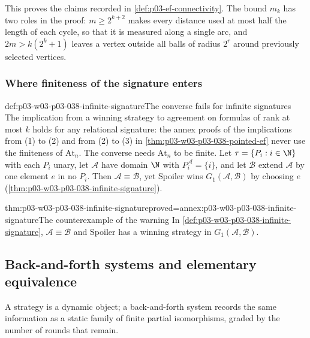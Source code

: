 This proves the claims recorded in \cref{def:p03-ef-connectivity}. The bound
\(m_k\) has two roles in the proof: \(m\ge2^{k+2}\) makes every distance
used at most half the length of each cycle, so that it is measured along a
single arc, and \(2m>k(2^k+1)\) leaves a vertex outside all balls of radius
\(2^r\) around previously selected vertices.

\subsubsection{Where finiteness of the signature enters}

\begin{hbwarning}{def:p03-w03-p03-038-infinite-signature}{The converse fails for infinite signatures}
The implication from a winning strategy to agreement on formulas of rank at
most \(k\) holds for any relational signature: the annex proofs of the
implications from (1) to (2) and from (2) to (3) in
\cref{thm:p03-w03-p03-038-pointed-ef} never use the finiteness of
\(\mathrm{At}_n\). The converse needs
\(\mathrm{At}_n\) to be finite. Let \(\tau=\{P_i:i\in\N\}\) with each
\(P_i\) unary, let \(\mathcal A\) have domain \(\N\) with
\(P_i^{\mathcal A}=\{i\}\), and let \(\mathcal B\) extend \(\mathcal A\)
by one element \(e\) in no \(P_i\). Then \(\mathcal A\equiv\mathcal B\),
yet Spoiler wins \(G_1(\mathcal A,\mathcal B)\) by choosing \(e\)
(\cref{thm:p03-w03-p03-038-infinite-signature}).
\end{hbwarning}

\begin{hblemma}{thm:p03-w03-p03-038-infinite-signature}{proved=annex:p03-w03-p03-038-infinite-signature}{The counterexample of the warning}
In \cref{def:p03-w03-p03-038-infinite-signature}, \(\mathcal A\equiv\mathcal B\)
and Spoiler has a winning strategy in \(G_1(\mathcal A,\mathcal B)\).
\end{hblemma}

\subsection{Back-and-forth systems and elementary equivalence}
\label{sec:p03-w03-p03-038-back-and-forth}

A strategy is a dynamic object; a back-and-forth system records the same
information as a static family of finite partial isomorphisms, graded by
the number of rounds that remain.

